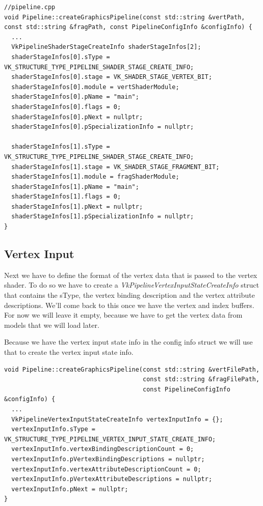 \documentclass[12pt]{report} \usepackage{preamble}
\begin{document}
\begin{lstlisting}[Language=C++]
//pipeline.cpp
void Pipeline::createGraphicsPipeline(const std::string &vertPath, const std::string &fragPath, const PipelineConfigInfo &configInfo) {
  ...
  VkPipelineShaderStageCreateInfo shaderStageInfos[2];
  shaderStageInfos[0].sType = VK_STRUCTURE_TYPE_PIPELINE_SHADER_STAGE_CREATE_INFO;
  shaderStageInfos[0].stage = VK_SHADER_STAGE_VERTEX_BIT;
  shaderStageInfos[0].module = vertShaderModule;
  shaderStageInfos[0].pName = "main";
  shaderStageInfos[0].flags = 0;
  shaderStageInfos[0].pNext = nullptr;
  shaderStageInfos[0].pSpecializationInfo = nullptr;

  shaderStageInfos[1].sType = VK_STRUCTURE_TYPE_PIPELINE_SHADER_STAGE_CREATE_INFO;
  shaderStageInfos[1].stage = VK_SHADER_STAGE_FRAGMENT_BIT;
  shaderStageInfos[1].module = fragShaderModule;
  shaderStageInfos[1].pName = "main";
  shaderStageInfos[1].flags = 0;
  shaderStageInfos[1].pNext = nullptr;
  shaderStageInfos[1].pSpecializationInfo = nullptr;
}
\end{lstlisting}

\subsection{Vertex Input}

Next we have to define the format of the vertex data that is passed to the vertex shader. To do so we have to create a
\textit{VkPipelineVertexInputStateCreateInfo} struct that contains the sType, the vertex binding description and the vertex
attribute descriptions. We'll come back to this once we have the vertex and index buffers. For now we will leave it empty,
because we have to get the vertex data from models that we will load later.

Because we have the vertex input state info in the config info struct we will use that to create the vertex input state info.

\begin{lstlisting}[Language=C++]
void Pipeline::createGraphicsPipeline(const std::string &vertFilePath,
                                      const std::string &fragFilePath,
                                      const PipelineConfigInfo &configInfo) {
  ...
  VkPipelineVertexInputStateCreateInfo vertexInputInfo = {};
  vertexInputInfo.sType = VK_STRUCTURE_TYPE_PIPELINE_VERTEX_INPUT_STATE_CREATE_INFO;
  vertexInputInfo.vertexBindingDescriptionCount = 0;
  vertexInputInfo.pVertexBindingDescriptions = nullptr;
  vertexInputInfo.vertexAttributeDescriptionCount = 0;
  vertexInputInfo.pVertexAttributeDescriptions = nullptr;
  vertexInputInfo.pNext = nullptr;
}
\end{lstlisting}
\end{document}
